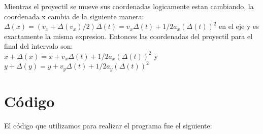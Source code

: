 \documentclass[10pt]{article}
\begin{document}
Mientras el proyectil se mueve sus coordenadas logicamente estan cambiando, la coordenada x cambia de la siguiente manera: $\Delta(x)=(v_{x}+\Delta(v_{x})/2)\Delta(t)=v_{x}\Delta(t)+1/2a_{x}(\Delta(t))^2$ en el eje y es exactamente la misma expresion. Entonces las coordenadas del proyectil para el final del intervalo son: \\

$x+\Delta(x)=x+v_{x}\Delta(t)+1/2a_{x}(\Delta(t))^2$ y $y+\Delta(y)=y+v_{y}\Delta(t)+1/2a_{y}(\Delta(t))^2$\\ 

\section{Código}

El código que utilizamos para realizar el programa fue el siguiente:\\
\end{document}
